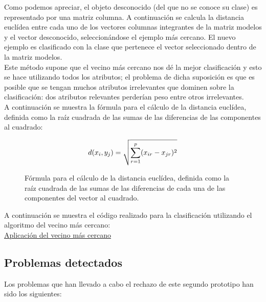 Como podemos apreciar, el objeto desconocido (del que no se conoce su clase) es representado por una matriz columna. A continuación se calcula la distancia euclídea entre cada uno de los vectores columnas integrantes de la matriz modelos y el vector desconocido, seleccionándose el ejemplo más cercano. El nuevo ejemplo es clasificado con la clase que pertenece el vector seleccionado dentro de la matriz modelos.\\

Este método supone que el vecino más cercano nos dé la mejor clasificación y esto se hace utilizando todos los atributos; el problema de dicha suposición es que es posible que se tengan muchos atributos irrelevantes que dominen sobre la clasificación: dos atributos relevantes perderían peso entre otros irrelevantes.\\

A continuación se muestra la fórmula para el cálculo de la distancia euclídea, definida como la raíz cuadrada de las sumas de las diferencias de las componentes al cuadrado:\\

\begin{figure}[H]
  \begin{center}
    \[
    d(x_{i},y_{j}) = \sqrt{\sum_{r=1}^p (x_{ir}-x_{jr})^2}
    \nocite{}
    \]
  \end{center}
  \label{eq:dist-euclid}
  \caption{Fórmula para el cálculo de la distancia euclídea, definida como la raíz cuadrada de las sumas de las diferencias de cada una de las componentes del vector al cuadrado.}
\end{figure}

A continuación se muestra el código realizado para la clasificación utilizando el algoritmo del vecino más cercano:\\

\underline{Aplicación del vecino más cercano}\\



\subsection{Problemas detectados}

Los problemas que han llevado a cabo el rechazo de este segundo prototipo han sido los siguientes:

